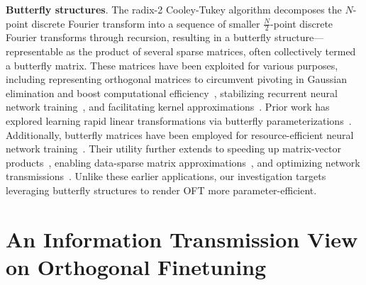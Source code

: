 \textbf{Butterfly structures}. The radix-2 Cooley-Tukey algorithm decomposes the $N$-point discrete Fourier transform into a sequence of smaller $\frac{N}{2}$-point discrete Fourier transforms through recursion, resulting in a butterfly structure—representable as the product of several sparse matrices, often collectively termed a butterfly matrix. These matrices have been exploited for various purposes, including representing orthogonal matrices to circumvent pivoting in Gaussian elimination and boost computational efficiency~\cite{parker1995random}, stabilizing recurrent neural network training~\cite{jing2017tunable}, and facilitating kernel approximations~\cite{munkhoeva2018quadrature}. Prior work has explored learning rapid linear transformations via butterfly parameterizations~\cite{dao2019learning,dao2019kaleidoscope}. Additionally, butterfly matrices have been employed for resource-efficient neural network training~\cite{chen2022pixelated,dao2022monarch}. Their utility further extends to speeding up matrix-vector products~\cite{michielssen1996multilevel,o2010algorithm}, enabling data-sparse matrix approximations~\cite{li2015butterfly}, and optimizing network transmissions~\cite{klasing1994broadcasting,li2003linear,rajasingh2016transmission}. Unlike these earlier applications, our investigation targets leveraging butterfly structures to render OFT more parameter-efficient.

\section{An Information Transmission View on Orthogonal Finetuning}

